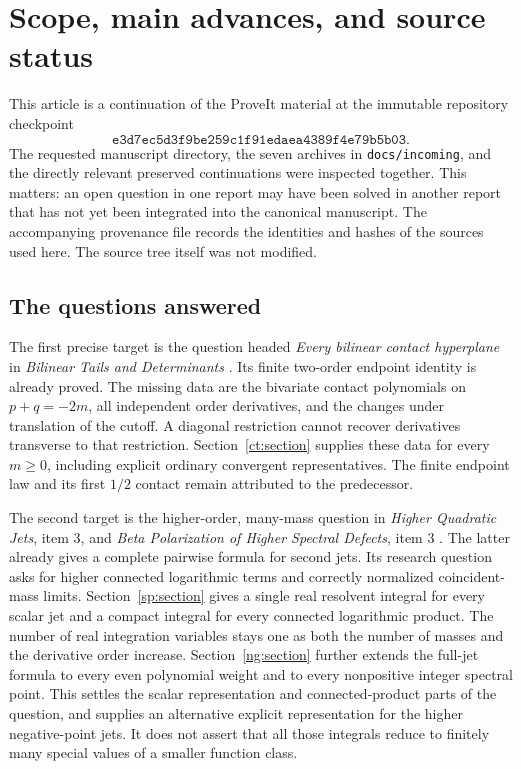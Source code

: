 \documentclass[11pt,letterpaper]{article}
\numberwithin{equation}{section}
\theoremstyle{definition}
\theoremstyle{remark}
\newcommand{\src}[1]{\nolinkurl{#1}}
\newcommand{\pin}{\texttt{e3d7ec5d3f9be259c1f91edaea4389f4e79b5b03}}
\begin{document}
\section{Scope, main advances, and source status}
\label{bc:scope}

This article is a continuation of the ProveIt material at the immutable
repository checkpoint
\[
 \pin .
\]
The requested manuscript directory, the seven archives in
\src{docs/incoming}, and the directly relevant preserved continuations were
inspected together. This matters: an open question in one report may have
been solved in another report that has not yet been integrated into the
canonical manuscript. The accompanying provenance file records the
identities and hashes of the sources used here. The source tree itself was
not modified.

\subsection{The questions answered}

The first precise target is the question headed \emph{Every bilinear contact
hyperplane} in \emph{Bilinear Tails and Determinants}
\cite{ProveItBilinear}. Its finite two-order endpoint identity is already
proved. The missing data are the bivariate contact polynomials on
\(p+q=-2m\), all independent order derivatives, and the changes under
translation of the cutoff. A diagonal restriction cannot recover
derivatives transverse to that restriction. Section~\ref{ct:section}
supplies these data for every \(m\ge0\), including explicit ordinary
convergent representatives. The finite endpoint law and its first
\(1/2\) contact remain attributed to the predecessor.

The second target is the higher-order, many-mass question in
\emph{Higher Quadratic Jets}, item 3, and \emph{Beta Polarization of Higher
Spectral Defects}, item 3
\cite{ProveItHigherQuadratic,ProveItHigherDefects}. The latter already gives
a complete pairwise formula for second jets. Its research question asks
for higher connected logarithmic terms and correctly normalized
coincident-mass limits. Section~\ref{sp:section} gives a single real
resolvent integral for every scalar jet and a compact integral for every
connected logarithmic product. The number of real integration variables
stays one as both the number of masses and the derivative order increase.
Section~\ref{ng:section} further extends the full-jet formula to every
even polynomial weight and to every nonpositive integer spectral point.
This settles the scalar representation and connected-product parts of the
question, and supplies an alternative explicit representation for the
higher negative-point jets. It does not assert that all those integrals reduce to finitely
many special values of a smaller function class.
\end{document}
